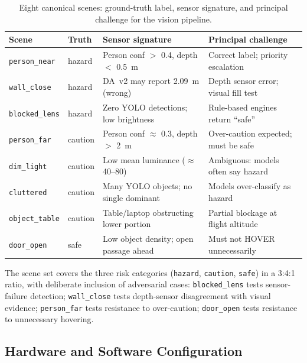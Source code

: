 \begin{table}[ht]
  \caption{Eight canonical scenes: ground-truth label, sensor signature, and principal challenge for the vision pipeline.}
  \label{tab:ch2_scenes}
  \centering
  \small
  \begin{tabular}{llll}
    \toprule
    Scene & Truth & Sensor signature & Principal challenge \\
    \midrule
    \texttt{person\_near}  & hazard  & Person conf $>$ 0.4, depth $<$ 0.5~m & Correct label; priority escalation \\
    \texttt{wall\_close}   & hazard  & DA~v2 may report 2.09~m (wrong)        & Depth sensor error; visual fill test \\
    \texttt{blocked\_lens} & hazard  & Zero YOLO detections; low brightness   & Rule-based engines return ``safe'' \\
    \texttt{person\_far}   & caution & Person conf $\approx$ 0.3, depth $>$ 2~m & Over-caution expected; must be safe \\
    \texttt{dim\_light}    & caution & Low mean luminance ($\approx$40--80)   & Ambiguous: models often say hazard \\
    \texttt{cluttered}     & caution & Many YOLO objects; no single dominant  & Models over-classify as hazard \\
    \texttt{object\_table} & caution & Table/laptop obstructing lower portion & Partial blockage at flight altitude \\
    \texttt{door\_open}    & safe    & Low object density; open passage ahead & Must not HOVER unnecessarily \\
    \bottomrule
  \end{tabular}
\end{table}

\newpage
The scene set covers the three risk categories (\texttt{hazard},
\texttt{caution}, \texttt{safe}) in a 3:4:1 ratio, with deliberate inclusion of adversarial cases: \texttt{blocked\_lens} tests sensor-failure detection; \texttt{wall\_close} tests depth-sensor disagreement with visual evidence; \texttt{person\_far} tests resistance to over-caution; \texttt{door\_open} tests resistance to unnecessary hovering.

\subsection{Hardware and Software Configuration}
\label{sec:ch2_setup_hw}

